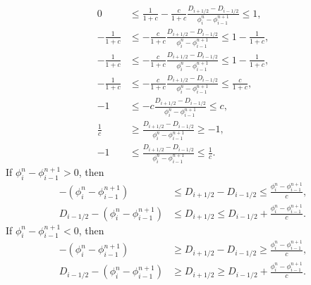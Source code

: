 \documentclass[../thesis.tex]{subfiles}
\begin{document}
\begin{equation}
    \begin{split}
        0
        &\leq
        \frac{1}{1+c}
        -\frac{c}{1+c}\frac{D_{i+1/2} - D_{i-1/2}}
        {\phi_{i}^{n} - \phi_{i-1}^{n+1}}
        \leq
        1,
        \\
        -\frac{1}{1+c}
        &\leq
        -\frac{c}{1+c}\frac{D_{i+1/2} - D_{i-1/2}}
        {\phi_{i}^{n} - \phi_{i-1}^{n+1}}
        \leq
        1-\frac{1}{1+c},
        \\
        -\frac{1}{1+c}
        &\leq
        -\frac{c}{1+c}\frac{D_{i+1/2} - D_{i-1/2}}
        {\phi_{i}^{n} - \phi_{i-1}^{n+1}}
        \leq
        1-\frac{1}{1+c},
        \\
        -\frac{1}{1+c}
        &\leq
        -\frac{c}{1+c}\frac{D_{i+1/2} - D_{i-1/2}}
        {\phi_{i}^{n} - \phi_{i-1}^{n+1}}
        \leq
        \frac{c}{1+c},
        \\
        -1
        &\leq
        -c\frac{D_{i+1/2} - D_{i-1/2}}
        {\phi_{i}^{n} - \phi_{i-1}^{n+1}}
        \leq
        c,
        \\
        \frac{1}{c}
        &\geq
        \frac{D_{i+1/2} - D_{i-1/2}}
        {\phi_{i}^{n} - \phi_{i-1}^{n+1}}
        \geq
        -1,
        \\
        -1
        &\leq
        \frac{D_{i+1/2} - D_{i-1/2}}
        {\phi_{i}^{n} - \phi_{i-1}^{n+1}}
        \leq
        \frac{1}{c}.
    \end{split}
\end{equation}
If \(\phi_{i}^{n} - \phi_{i-1}^{n+1} > 0\), then
\begin{equation}
    \begin{split}
        -(\phi_{i}^{n} - \phi_{i-1}^{n+1})
        &\leq
        D_{i+1/2} - D_{i-1/2}
        \leq
        \frac{\phi_{i}^{n} - \phi_{i-1}^{n+1}}{c},
        \\
        D_{i-1/2} - (\phi_{i}^{n} - \phi_{i-1}^{n+1})
        &\leq
        D_{i+1/2}
        \leq
        D_{i-1/2} + \frac{\phi_{i}^{n} - \phi_{i-1}^{n+1}}{c}.
    \end{split}
\end{equation}
If \(\phi_{i}^{n} - \phi_{i-1}^{n+1} < 0\), then
\begin{equation}
    \begin{split}
        -(\phi_{i}^{n} - \phi_{i-1}^{n+1})
        &\geq
        D_{i+1/2} - D_{i-1/2}
        \geq
        \frac{\phi_{i}^{n} - \phi_{i-1}^{n+1}}{c},
        \\
        D_{i-1/2} - (\phi_{i}^{n} - \phi_{i-1}^{n+1})
        &\geq
        D_{i+1/2}
        \geq
        D_{i-1/2} + \frac{\phi_{i}^{n} - \phi_{i-1}^{n+1}}{c}.
    \end{split}
\end{equation}
\end{document}
